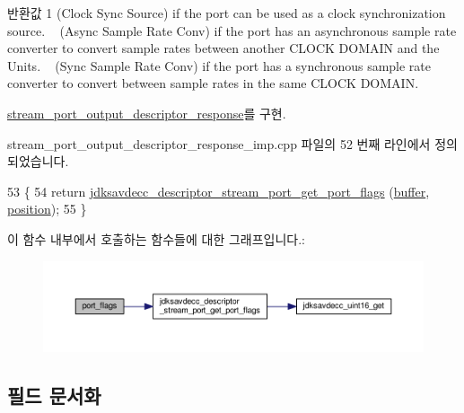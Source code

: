 \begin{DoxyReturn}{반환값}
1 (Clock Sync Source) if the port can be used as a clock synchronization source. ~ (Async Sample Rate Conv) if the port has an asynchronous sample rate converter to convert sample rates between another C\+L\+O\+CK D\+O\+M\+A\+IN and the Unit\textquotesingle{}s. ~ (Sync Sample Rate Conv) if the port has a synchronous sample rate converter to convert between sample rates in the same C\+L\+O\+CK D\+O\+M\+A\+IN. 
\end{DoxyReturn}


\hyperlink{classavdecc__lib_1_1stream__port__output__descriptor__response_a66bad2f1317cba04f0ea271f7181b58f}{stream\+\_\+port\+\_\+output\+\_\+descriptor\+\_\+response}를 구현.



stream\+\_\+port\+\_\+output\+\_\+descriptor\+\_\+response\+\_\+imp.\+cpp 파일의 52 번째 라인에서 정의되었습니다.


\begin{DoxyCode}
53 \{
54     \textcolor{keywordflow}{return} \hyperlink{group__descriptor__stream__port_ga95f34b2f9da40d90ee1b5b7fcda8403f}{jdksavdecc\_descriptor\_stream\_port\_get\_port\_flags}
      (\hyperlink{classavdecc__lib_1_1descriptor__response__base__imp_a56ed84df35de10bdb65e72b184309497}{buffer}, \hyperlink{classavdecc__lib_1_1descriptor__response__base__imp_a7a04afe5347934be732ec70a70bd0a28}{position});
55 \}
\end{DoxyCode}


이 함수 내부에서 호출하는 함수들에 대한 그래프입니다.\+:
\nopagebreak
\begin{figure}[H]
\begin{center}
\leavevmode
\includegraphics[width=350pt]{classavdecc__lib_1_1stream__port__output__descriptor__response__imp_ae5cbe71db539f040ce51a399c2ba66c5_cgraph}
\end{center}
\end{figure}




\subsection{필드 문서화}
